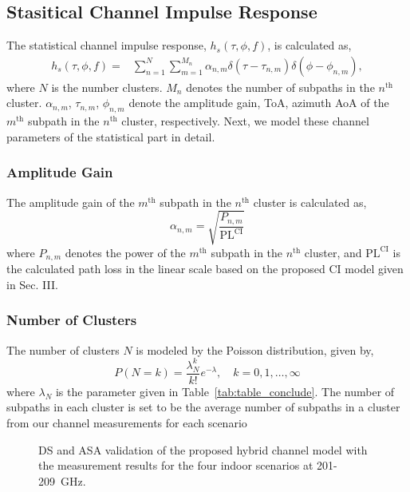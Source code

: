 \documentclass[journal,12pt,draftclsnofoot,onecolumn]{IEEEtran}
\begin{document}
 \subsection{Stasitical Channel Impulse Response}
 The statistical channel impulse response, $h_s(\tau,\phi,f)$, is calculated as,
    \begin{equation}
    \begin{split}
    h_s(\tau,\phi,f)=&\sum^{ N}_{n=1}\sum^{{M_n}}_{m=1}\alpha_{n,m}\delta(\tau-\tau_{n,m})\delta(\phi-\phi_{n,m}),
    \label{eq:statistical-cir}
    \end{split}
    \end{equation}
    where $N$ is the number clusters. $M_n$ denotes the number of subpaths in the $n^{\mathrm{th}}$ cluster. $\alpha_{n,m}$, $\tau_{n,m}$, $\phi_{n,m}$ denote the amplitude gain, ToA, azimuth AoA of the $m^{\mathrm{th}}$ subpath in the $n ^{\mathrm{th}}$ cluster, respectively. Next, we model these channel parameters of the statistical part in detail. 


\subsubsection{Amplitude Gain}
The amplitude gain of the $m^\text{th}$ subpath in the $n^\text{th}$ cluster is calculated as,
\begin{equation}
    \alpha_{n,m}=\sqrt{\frac{P_{n,m}}{\text{PL}^\text{CI}}}
\end{equation}
where $P_{n,m}$ denotes the power of the $m^{\text{th}}$ subpath in the $n^{\text{th}}$ cluster, and $\text{PL}^\text{CI}$ is the calculated path loss in the linear scale based on the proposed CI model given in Sec. III.
    
	\subsubsection{Number of Clusters}
	The number of clusters $N$ is modeled by the Poisson distribution, given by,
	\begin{equation}
	    P(N=k)=\frac{\lambda_N^k}{k!}e^{-\lambda},\quad k=0,1,\dots,\infty
	\end{equation}
where $\lambda_N$ is the parameter given in Table~\ref{tab:table_conclude}. The number of subpaths in each cluster is set to be the average number of subpaths in a cluster from our channel measurements for each scenario
\begin{figure}[ht]
\centering
{}
\centering
{}
\caption{DS and ASA validation of the proposed hybrid channel model with the measurement results for the four indoor scenarios at 201-209~GHz.}
\label{fig:model_validation_220}
\end{figure}
\end{document}
